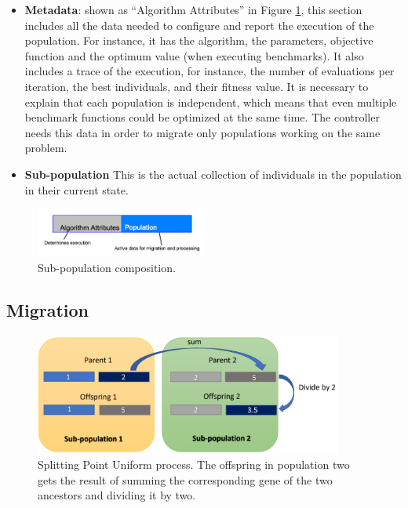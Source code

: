 \documentclass[runningheads]{llncs}
\begin{document}
\begin{itemize}
  \item {\bf Metadata}: shown as ``Algorithm Attributes'' in Figure \ref{subpop}, this
    section includes all the data needed 
  to configure and report the execution of the population.
  For instance, it has the algorithm, the parameters, objective function and 
  the optimum value (when executing benchmarks). It also includes a trace of the execution, 
  for instance, the number of evaluations per iteration, 
  the best individuals, and their fitness value.  
  It is necessary to explain that each population is independent, which means
  that even multiple benchmark functions could be optimized at the same time.
  The controller needs this data in order to migrate only populations working on
  the same problem. 
  \item {\bf Sub-population} This is the actual collection of
  individuals in the population in their current state.  
\end{itemize}
%
\begin{figure}[htp]
  \centering
  \includegraphics[width=0.5\textwidth]{img/subpopulationDefinition.png}
  \caption{Sub-population composition.} \label{subpop}
\end{figure}


\subsection{Migration} 
%
\begin{figure}[htp]
  \centering
  \includegraphics[width=0.9\textwidth]{img/splittinPointUniform.png}
  \caption{Splitting Point Uniform process. The offspring in
    population two gets the result of summing the corresponding gene
    of the two ancestors and dividing it by two.} \label{fig4}

\end{figure}
\end{document}
